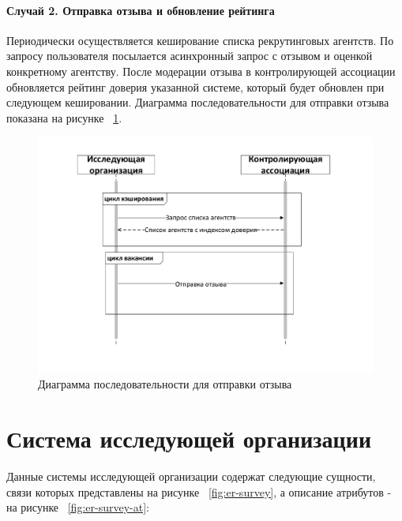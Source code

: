 \paragraph{Случай 2. Отправка отзыва и обновление рейтинга}

Периодически осуществляется кеширование списка рекрутинговых агентств. По запросу пользователя посылается асинхронный запрос с отзывом и оценкой конкретному агентству. После модерации отзыва в контролирующей ассоциации обновляется рейтинг доверия указанной системе, который будет обновлен при следующем кешировании.  
Диаграмма последовательности для отправки отзыва показана на рисунке ~\ref{fig:sequence2}.

\begin{figure}[ht]
  \centering
  \includegraphics[width=\textwidth]{include/sequence2.pdf}
\caption{Диаграмма последовательности для отправки отзыва}
\label{fig:sequence2}
\end{figure}

\section{Система исследующей организации}
Данные системы исследующей организации содержат следующие сущности, связи которых представлены на рисунке ~\ref{fig:er-survey}, а описание атрибутов - на рисунке ~\ref{fig:er-survey-at}:

